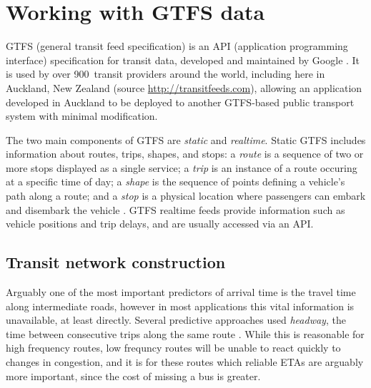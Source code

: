 \section{Working with GTFS data}
\label{sec:gtfs}

GTFS (general transit feed specification)
is an API (application programming interface) specification for transit data,
developed and maintained by Google \citep{GoogleDevelopers_2006}.
It is used by over 900~transit providers around the world,
including here in Auckland, New Zealand
(source \url{http://transitfeeds.com}),
allowing an application developed in Auckland to
be deployed to another GTFS-based public transport system with minimal modification.


The two main components of GTFS are \emph{static} and \emph{realtime}.
Static GTFS includes information about routes, trips, shapes, and stops:
a \emph{route} is a sequence of two or more stops displayed as a single service;
a \emph{trip} is an instance of a route occuring at a specific time of day;
a \emph{shape} is the sequence of points defining a vehicle's path along a route;
and a \emph{stop} is a physical location where passengers can embark and disembark
the vehicle \citep{GoogleDevelopers_2006}.
GTFS realtime feeds provide information such as vehicle positions and trip delays,
and are usually accessed via an API.

\subsection{Transit network construction}
\label{sec:network_build}

Arguably one of the most important predictors of arrival time is
the travel time along intermediate roads,
however in most applications this vital information is unavailable,
at least directly. 
Several predictive approaches used \emph{headway},
the time between consecutive trips along the same route
\citep{Hans_2015}.
While this is reasonable for high frequency routes,
low frequncy routes will be unable to react quickly to changes in congestion,
and it is for these routes which reliable ETAs are arguably more important,
since the cost of missing a bus is greater.


